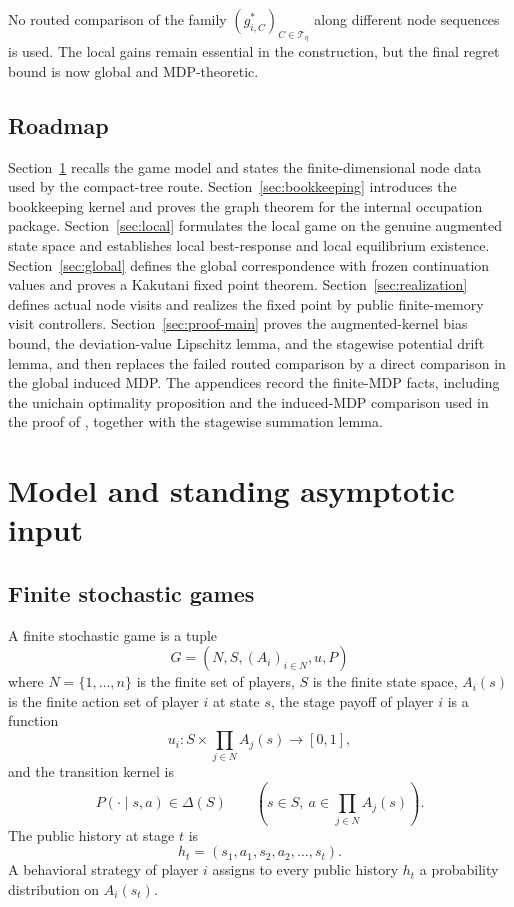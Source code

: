 \documentclass[12pt]{article}
\theoremstyle{definition}
\newcommand{\1}{\mathbf{1}}
\newcommand{\cT}{\mathcal{T}}
\begin{document}
No routed comparison of the family $(g_{i,C}^*)_{C\in\cT_\eta}$ along different
node sequences is used. The local gains remain essential in the construction,
but the final regret bound is now global and MDP-theoretic.

\subsection{Roadmap}



Section~\ref{sec:model} recalls the game model and states the finite-dimensional
node data used by the compact-tree route. Section~\ref{sec:bookkeeping}
introduces the bookkeeping kernel and proves the graph theorem for the internal
occupation package. Section~\ref{sec:local} formulates the local game on the
genuine augmented state space and establishes local best-response and local
equilibrium existence. Section~\ref{sec:global} defines the global correspondence
with frozen continuation values and proves a Kakutani fixed point theorem.
Section~\ref{sec:realization} defines actual node visits and realizes the fixed
point by public finite-memory visit controllers. Section~\ref{sec:proof-main}
proves the augmented-kernel bias bound, the deviation-value Lipschitz lemma, and
the stagewise potential drift lemma, and then replaces the failed routed
comparison by a direct comparison in the global induced MDP. The appendices
record the finite-MDP facts, including the unichain optimality proposition and
the induced-MDP comparison used in the proof of , together with
the stagewise summation lemma.

\section{Model and standing asymptotic input}
\label{sec:model}

\subsection{Finite stochastic games}

A finite stochastic game is a tuple
\[
G=(N,S,(A_i)_{i\in N},u,P)
\]
where $N=\{1,\dots,n\}$ is the finite set of players, $S$ is the finite state
space, $A_i(s)$ is the finite action set of player $i$ at state $s$, the stage
payoff of player $i$ is a function
\[
u_i:S\times \prod_{j\in N}A_j(s)\to [0,1],
\]
and the transition kernel is
\[
P(\cdot\mid s,a)\in \Delta(S)
\qquad (s\in S,\ a\in \prod_{j\in N}A_j(s)).
\]
The public history at stage $t$ is
\[
h_t=(s_1,a_1,s_2,a_2,\dots,s_t).
\]
A behavioral strategy of player $i$ assigns to every public history $h_t$ a
probability distribution on $A_i(s_t)$.
\end{document}
